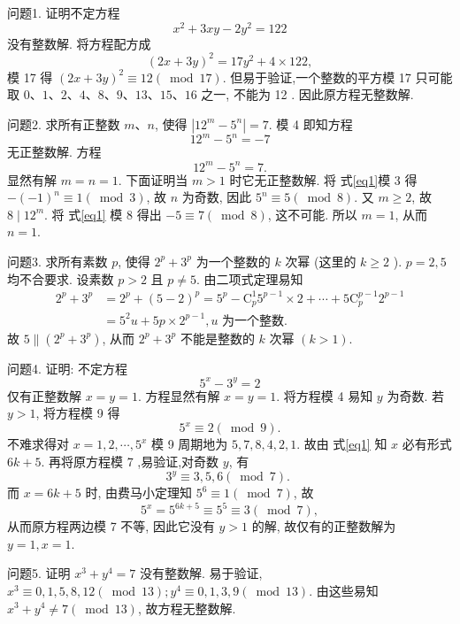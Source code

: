 
问题1. 证明不定方程
$$
x^2+3 x y-2 y^2=122
$$
没有整数解.
将方程配方成
$$
(2 x+3 y)^2=17 y^2+4 \times 122,
$$
模 17 得 $(2 x+3 y)^2 \equiv 12(\bmod 17)$. 但易于验证,一个整数的平方模 17 只可能取 $0 、 1 、 2 、 4 、 8 、 9 、 13 、 15 、 16$ 之一, 不能为 12 . 因此原方程无整数解.



问题2. 求所有正整数 $m 、 n$, 使得 $\left|12^m-5^n\right|=7$.
模 4 即知方程
$$
12^m-5^n=-7
$$
无正整数解.
方程
$$
12^m-5^n=7 . \label{eq1}
$$
显然有解 $m=n=1$. 下面证明当 $m>1$ 时它无正整数解.
将 式\ref{eq1}模 3 得 $-(-1)^n \equiv 1(\bmod 3)$, 故 $n$ 为奇数, 因此 $5^n \equiv 5(\bmod 8)$. 又 $m \geqslant 2$, 故 $8 \mid 12^m$.
将 式\ref{eq1} 模 8 得出 $-5 \equiv 7(\bmod 8)$, 这不可能.
所以 $m=1$, 从而 $n=1$.



问题3. 求所有素数 $p$, 使得 $2^p+3^p$ 为一个整数的 $k$ 次幂 (这里的 $k \geqslant 2$ ).
$p=2,5$ 均不合要求.
设素数 $p>2$ 且 $p \neq 5$. 由二项式定理易知
$$
\begin{aligned}
2^p+3^p & =2^p+(5-2)^p=5^p-\mathrm{C}_p^1 5^{p-1} \times 2+\cdots+5 \mathrm{C}_p^{p-1} 2^{p-1} \\
& =5^2 u+5 p \times 2^{p-1}, u \text { 为一个整数.
}
\end{aligned}
$$
故 $5 \|\left(2^p+3^p\right)$, 从而 $2^p+3^p$ 不能是整数的 $k$ 次幂 $(k>1)$.



问题4. 证明: 不定方程
$$
5^x-3^y=2
$$
仅有正整数解 $x=y=1$.
方程显然有解 $x=y=1$. 将方程模 4 易知 $y$ 为奇数.
若 $y>1$, 将方程模 9 得
$$
5^x \equiv 2(\bmod 9) . \label{eq1}
$$
不难求得对 $x=1,2, \cdots, 5^x$ 模 9 周期地为 $5,7,8,4,2,1$. 故由 式\ref{eq1} 知 $x$ 必有形式 $6 k+5$. 再将原方程模 7 ,易验证,对奇数 $y$, 有
$$
3^y \equiv 3,5,6(\bmod 7) \text {. }
$$
而 $x=6 k+5$ 时, 由费马小定理知 $5^6 \equiv 1(\bmod 7)$, 故
$$
5^x=5^{6 k+5} \equiv 5^5 \equiv 3(\bmod 7),
$$
从而原方程两边模 7 不等, 因此它没有 $y>1$ 的解, 故仅有的正整数解为 $y= 1, x=1$.



问题5. 证明 $x^3+y^4=7$ 没有整数解.
易于验证, $x^3 \equiv 0,1,5,8,12(\bmod 13) ; y^4 \equiv 0,1,3,9(\bmod 13)$.
由这些易知 $x^3+y^4 \neq 7(\bmod 13)$, 故方程无整数解.



